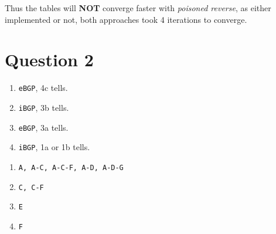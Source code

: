 \documentclass[12pt]{article}
\newcommand{\ilc}{\texttt}
\begin{document}
Thus the tables will \textbf{NOT} converge faster with \textit{poisoned reverse}, as either implemented or not, both approaches took 4 iterations to converge.

\section{Question 2}

\begin{enumerate}[label=(\alph*)]
    \item \ilc{eBGP}, 4c tells.
    \item \ilc{iBGP}, 3b tells.
    \item \ilc{eBGP}, 3a tells.
    \item \ilc{iBGP}, 1a or 1b tells.
\end{enumerate}

\smallskip

\begin{enumerate}[label=(\roman*)]
    \item \ilc{A, A-C, A-C-F, A-D, A-D-G}
    \item \ilc{C, C-F}
    \item \ilc{E}
    \item \ilc{F}
\end{enumerate}


%
% 
% 
\end{document}
